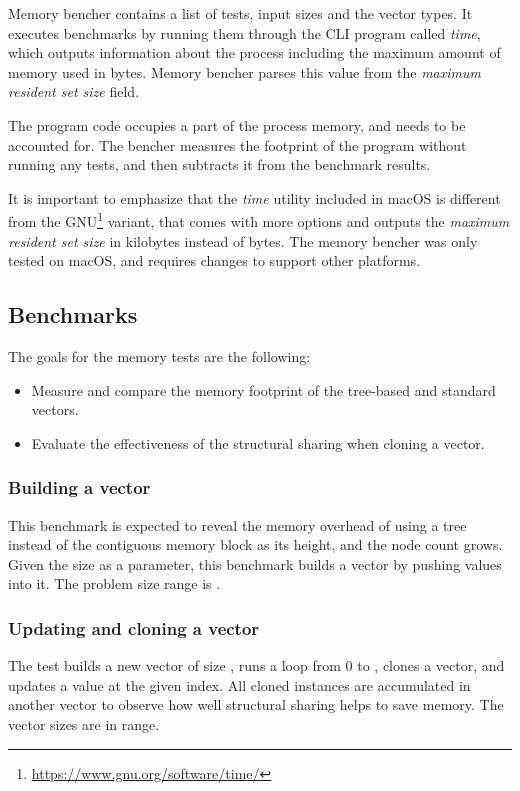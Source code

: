 Memory bencher contains a list of tests, input sizes and the vector types. It executes benchmarks by running them through the CLI program called \emph{time}, which outputs information about the process including the maximum amount of memory used in bytes. Memory bencher parses this value from the \emph{maximum resident set size} field.

The program code occupies a part of the process memory, and needs to be accounted for. The bencher measures the footprint of the program without running any tests, and then subtracts it from the benchmark results.

It is important to emphasize that the \emph{time} utility included in macOS is different from the GNU\footnote{\url{https://www.gnu.org/software/time/}} variant, that comes with more options and outputs the \emph{maximum resident set size} in kilobytes instead of bytes. The memory bencher was only tested on macOS, and requires changes to support other platforms.

\subsection{Benchmarks}
The goals for the memory tests are the following:
\begin{itemize}
    \item Measure and compare the memory footprint of the tree-based and standard vectors.
    \item Evaluate the effectiveness of the structural sharing when cloning a vector.
\end{itemize}

\subsubsection*{Building a vector}
This benchmark is expected to reveal the memory overhead of using a tree instead of the contiguous memory block as its height, and the node count grows. Given the size \n{} as a parameter, this benchmark builds a vector by pushing \n{} values into it. The problem size range is \range{[20, 60k]}.

\subsubsection*{Updating and cloning a vector}
The test builds a new vector of size \n{}, runs a loop from 0 to \n{}, clones a vector, and updates a value at the given index. All cloned instances are accumulated in another vector to observe how well structural sharing helps to save memory. The vector sizes are in \range{[20, 60k]} range.

